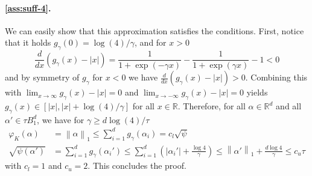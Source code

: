 \documentclass[a4paper]{article}
\newcommand{\pr}[1]{\left(#1\right)}
\newcommand{\abs}[1]{\left\lvert#1\right\rvert}
\newcommand{\norm}[1]{\left\|#1\right\|}
\newcommand{\RR}[0]{\mathbb{R}}
\theoremstyle{thmstyle}
\theoremstyle{defstyle}
\theoremstyle{remark}
\begin{document}
\paragraph{\ref{ass:suff-4}.}
We can easily show that this approximation satisfies the conditions. First, notice that it holds $g_\gamma(0)=\log(4)/\gamma$, and for $x>0$
\begin{equation*}
    \frac{d}{dx}\pr{g_\gamma(x)-\abs{x}}=\frac{1}{1+\exp\pr{-\gamma x}}-\frac{1}{1+\exp\pr{\gamma x}}-1<0
\end{equation*}
and by symmetry of $g_\gamma$ for $x<0$ we have $\frac{d}{dx}\pr{g_\gamma(x)-\abs{x}}>0$. Combining this with $\lim_{x\to\infty}g_\gamma(x)-\abs{x} = 0$ and $\lim_{x\to-\infty}g_\gamma(x)-\abs{x} = 0$ yields $g_\gamma(x)\in[\abs{x},\abs{x}+\log(4)/\gamma]$ for all $x\in\RR$.
Therefore, for all $\alpha\in \RR^d$ and all $\alpha'\in \tau B_1^d$, we have for $\gamma \geq d\log (4)/\tau$
\begin{align*}
    \varphi_K(\alpha)&=\norm{\alpha}_1 \leq \sum_{i=1}^dg_\gamma(\alpha_i)=c_l\sqrt{\psi} \\
    \sqrt{\psi(\alpha')}&= \sum_{i=1}^dg_\gamma(\alpha_i') \leq \sum_{i=1}^d \pr{\abs{\alpha_i'} + \frac{\log 4}{\gamma}} \leq \norm{\alpha'}_1+\frac{d\log 4}{\gamma} \leq c_u\tau
\end{align*}
with $c_l=1$ and $c_u=2$. This concludes the proof.
\end{document}
